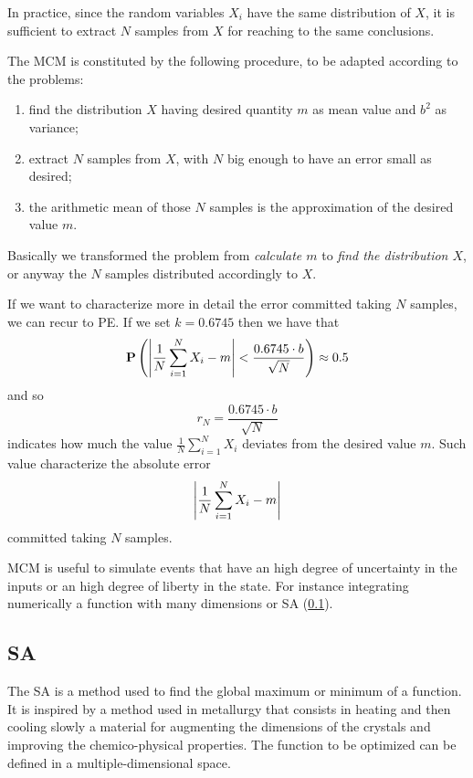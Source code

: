\documentclass[dissertation.tex]{subfiles}
\begin{document}
In practice, since the random variables $X_i$ have the same
distribution of $X$, it is sufficient to extract $N$ samples from $X$ for
reaching to the same conclusions.

The \acf{MCM} is constituted by the following procedure, to be adapted
according to the problems:
\begin{enumerate}
\item find the distribution $X$ having desired quantity $m$ as mean
  value and $b^2$ as variance;
\item extract $N$ samples from $X$, with $N$ big enough to have an
  error small as desired;
\item the arithmetic mean of those $N$ samples is the approximation of
  the desired value $m$.
\end{enumerate}
Basically we transformed the problem from \emph{calculate $m$} to \emph{find
  the distribution $X$}, or anyway the $N$ samples distributed
accordingly to $X$.

If we want to characterize more in detail the error committed taking
$N$ samples, we can recur to \ac{PE}. If we set $k=0.6745$ then we
have that
\begin{equation*}
  \mathrm{\textbf{P}}\left(\left|\frac{1}{N}\sum_{i=1}^NX_i-m\right| <\frac{0.6745\cdot b}{\sqrt{N}}\right)\approx 0.5
\end{equation*}
and so
\begin{equation*}
  r_N = \frac{0.6745\cdot b}{\sqrt{N}}
\end{equation*}
indicates how much the value $\frac{1}{N}\sum_{i=1}^NX_i$ deviates
from the desired value $m$. Such value characterize the absolute error
\begin{equation*}
\left|\frac{1}{N}\sum_{i=1}^NX_i-m\right|  
\end{equation*}
committed taking $N$ samples.

\ac{MCM} is useful to simulate events that have an high degree of
uncertainty in the inputs or an high degree of liberty in the
state. For instance integrating numerically a function with many
dimensions or \acf{SA} (\cref{sec:simulatedAnnealing}).

\subsection{\acf{SA}}\label{sec:simulatedAnnealing}
The \ac{SA} is a method used to find the global maximum or
minimum of a function. It is inspired by a method
used in metallurgy that consists in heating and then cooling slowly a
material for augmenting the dimensions of the crystals and improving
the chemico-physical properties. The function to be optimized can be
defined in a multiple-dimensional space.
\end{document}

